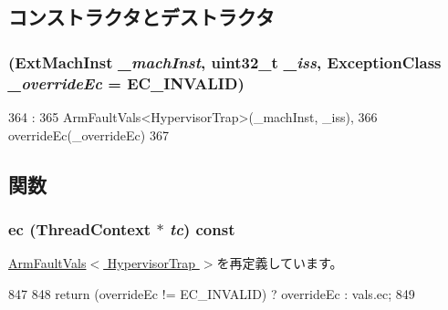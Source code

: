 \subsection{コンストラクタとデストラクタ}
\hypertarget{classArmISA_1_1HypervisorTrap_aed3e8c939479b9f3acffeafc9de7f777}{
\subsubsection[{HypervisorTrap}]{ (ExtMachInst {\em \_\-machInst}, \/  {\bf uint32\_\-t} {\em \_\-iss}, \/  {\bf ExceptionClass} {\em \_\-overrideEc} = {\ttfamily EC\_\-INVALID})}}
\label{classArmISA_1_1HypervisorTrap_aed3e8c939479b9f3acffeafc9de7f777}



\begin{DoxyCode}
364                                                             :
365       ArmFaultVals<HypervisorTrap>(_machInst, _iss),
366       overrideEc(_overrideEc)
367     {}

\end{DoxyCode}


\subsection{関数}
\hypertarget{classArmISA_1_1HypervisorTrap_aefab73b22a74d7c48b8a23230906d7cd}{
\subsubsection[{ec}]{ ec ({\bf ThreadContext} $\ast$ {\em tc}) const}}
\label{classArmISA_1_1HypervisorTrap_aefab73b22a74d7c48b8a23230906d7cd}


\hyperlink{classArmISA_1_1ArmFaultVals_aa4dd5fb47a1253dbe17e692e905a8c7c}{ArmFaultVals$<$ HypervisorTrap $>$}を再定義しています。


\begin{DoxyCode}
847 {
848     return (overrideEc != EC_INVALID) ? overrideEc : vals.ec;
849 }
\end{DoxyCode}


